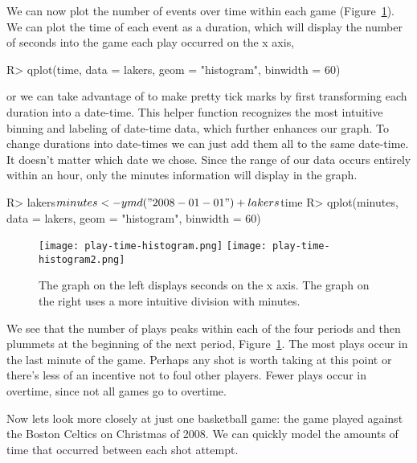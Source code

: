 \documentclass[article]{jss}
\begin{document}

We can now plot the number of events over time within each game (Figure~\ref{fig:plays}). We can plot the time of each event as a duration, which will display the number of seconds into the game each play occurred on the x axis,

\begin{CodeInput}
R> qplot(time, data = lakers, geom = "histogram", binwidth = 60)
\end{CodeInput}

or we can take advantage of  to make pretty tick marks by first transforming each duration into a date-time. This helper function recognizes the most intuitive binning and labeling of date-time data, which further enhances our graph. To change durations into date-times we can just add them all to the same date-time. It doesn't matter which date we chose. Since the range of our data occurs entirely within an hour, only the minutes information will display in the graph.

\begin{CodeInput}
R> lakers$minutes <- ymd("2008-01-01") + lakers$time
R> qplot(minutes, data = lakers, geom = "histogram", binwidth = 60)
\end{CodeInput}

\begin{figure}[htpb]
  \centering
  \texttt{[image: play-time-histogram.png]}
  \texttt{[image: play-time-histogram2.png]}
  \caption{The graph on the left displays seconds on the x axis. The graph on the right uses a more intuitive division with minutes.}
  \label{fig:plays}
\end{figure}

We see that the number of plays peaks within each of the four periods and then plummets at the beginning of the next period, Figure~\ref{fig:plays}. The most plays occur in the last minute of the game. Perhaps any shot is worth taking at this point or there's less of an incentive not to foul other players. Fewer plays occur in overtime, since not all games go to overtime.

Now lets look more closely at just one basketball game: the game played against the Boston Celtics on Christmas of 2008. We can quickly model the amounts of time that occurred between each shot attempt.
\end{document}
